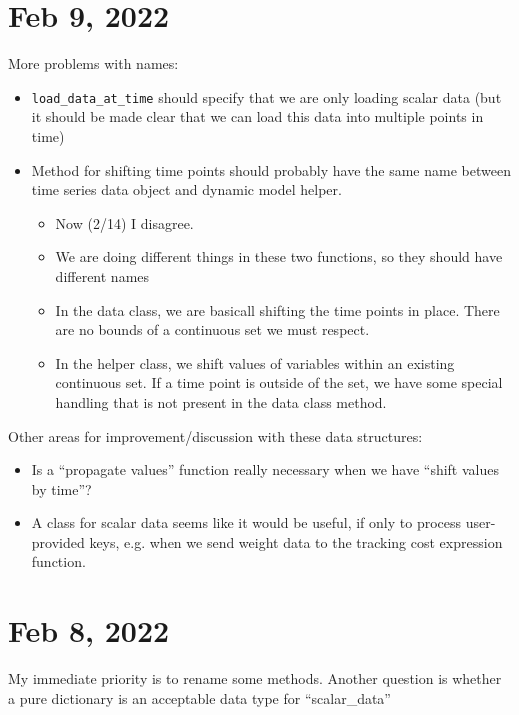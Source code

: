 \documentclass{article}
\begin{document}
\section{Feb 9, 2022}

More problems with names:
\begin{itemize}
  \item \texttt{load\_data\_at\_time} should specify that we are only
    loading scalar data (but it should be made clear that we can load
    this data into multiple points in time)
  \item Method for shifting time points should probably have the same
    name between time series data object and dynamic model helper.
    \begin{itemize}
      \item Now (2/14) I disagree.
      \item We are doing different things in these two functions, so they
	should have different names
      \item In the data class, we are basicall shifting the time points
	in place. There are no bounds of a continuous set we must
	respect.
      \item In the helper class, we shift values of variables within an
	existing continuous set. If a time point is outside of the set,
	we have some special handling that is not present in the data class
	method.
    \end{itemize}
\end{itemize}

Other areas for improvement/discussion with these data structures:
\begin{itemize}
  \item Is a ``propagate values'' function really necessary when we
    have ``shift values by time''?
  \item A class for scalar data seems like it would be useful, if only to
    process user-provided keys, e.g. when we send weight data to
    the tracking cost expression function.
\end{itemize}

\section{Feb 8, 2022}

My immediate priority is to rename some methods.
Another question is whether a pure dictionary is an acceptable
data type for ``scalar\_data''
\end{document}
